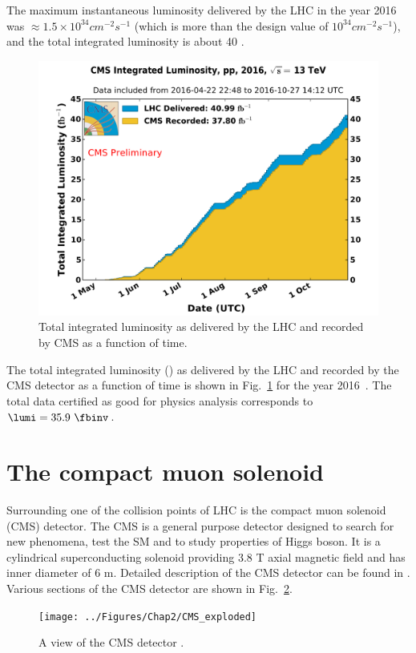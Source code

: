 The maximum instantaneous luminosity delivered by the LHC in the year 2016 was $\approx1.5\times 10^{34} cm^{-2}s^{-1}$ \cite{lumicms} 
(which is more than the design value of $10^{34} cm^{-2}s^{-1}$), and the total integrated luminosity is about 40 \fbinv.
\begin{figure}[h!]
\centering
\includegraphics[width=0.7\linewidth]{../Figures/Chap2/int_lumi_per_day_cumulative_pp_2016}
\caption[Integrated luminosity of data]{Total integrated luminosity as delivered by the LHC and recorded by CMS as a function of time.}
\label{fig:int_lumi_per_day_cumulative_pp_2016}
\end{figure}
The total integrated luminosity (\lumi) as delivered by the LHC and recorded by the CMS detector as a function of time is shown in 
Fig.~\ref{fig:int_lumi_per_day_cumulative_pp_2016} for the year 2016~\cite{lumicms}. The total data certified as good for physics analysis 
corresponds to $\lumi = 35.9\ \fbinv$.

\section{The compact muon solenoid}
Surrounding one of the collision points of LHC is the compact muon solenoid (CMS) detector. The CMS is a general purpose detector designed to 
search for new phenomena, test the SM and to study properties of Higgs boson. It is a cylindrical superconducting solenoid providing 3.8 T 
axial magnetic field and has inner diameter of 6 m. Detailed description of the CMS detector can be found in \cite{Chatrchyan:2008aa}. 
Various sections of the CMS detector are shown in Fig.~\ref{fig:CMS_exploded}.
\begin{figure}[h!]
\centering
\texttt{[image: ../Figures/Chap2/CMS\_exploded]}
\caption[CMS detector view]{A view of the CMS detector \cite{Chatrchyan:2008aa}.}
\label{fig:CMS_exploded}
\end{figure}

